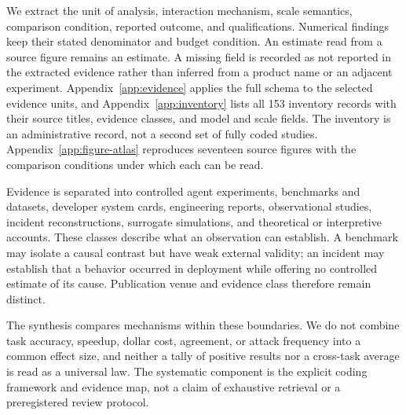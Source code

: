 We extract the unit of analysis, interaction mechanism, scale semantics, comparison condition, reported outcome, and qualifications. Numerical findings keep their stated denominator and budget condition. An estimate read from a source figure remains an estimate. A missing field is recorded as not reported in the extracted evidence rather than inferred from a product name or an adjacent experiment. Appendix~\ref{app:evidence} applies the full schema to the selected evidence units, and Appendix~\ref{app:inventory} lists all 153 inventory records with their source titles, evidence classes, and model and scale fields. The inventory is an administrative record, not a second set of fully coded studies. Appendix~\ref{app:figure-atlas} reproduces seventeen source figures with the comparison conditions under which each can be read.

Evidence is separated into controlled agent experiments, benchmarks and datasets, developer system cards, engineering reports, observational studies, incident reconstructions, surrogate simulations, and theoretical or interpretive accounts. These classes describe what an observation can establish. A benchmark may isolate a causal contrast but have weak external validity; an incident may establish that a behavior occurred in deployment while offering no controlled estimate of its cause. Publication venue and evidence class therefore remain distinct.

The synthesis compares mechanisms within these boundaries. We do not combine task accuracy, speedup, dollar cost, agreement, or attack frequency into a common effect size, and neither a tally of positive results nor a cross-task average is read as a universal law. The systematic component is the explicit coding framework and evidence map, not a claim of exhaustive retrieval or a preregistered review protocol.
